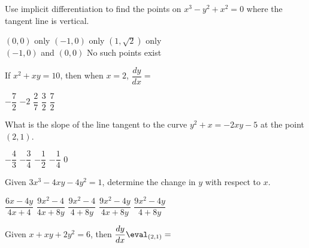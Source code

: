 \begin{questions}
    \question Use implicit differentiation to find the points on $x^3 - y^2 + x^2 = 0$ where the tangent line is vertical. \\

    \begin{oneparchoices}
        \choice $(0, 0)$ only
        \choice $(-1, 0)$ only
        \choice $\left(1, \sqrt{2}\right)$ only \\[11pt]
        \makebox[0.19\textwidth] \choice $(-1, 0)$ and $(0, 0)$
        \makebox[0.21\textwidth] \choice No such points exist
    \end{oneparchoices} \par \horizontalline

    \question If $x^2 + xy = 10$, then when $x = 2$, $\dfrac{dy}{dx} = $ \\
    
    \begin{oneparchoices}
        \choice $-\dfrac{7}{2}$
        \choice $-2$
        \choice $\dfrac{2}{7}$
        \choice $\dfrac{3}{2}$
        \choice $\dfrac{7}{2}$
    \end{oneparchoices} \par \horizontalline

    \question What is the slope of the line tangent to the curve $y^2 + x = -2xy - 5$ at the point $(2, 1)$. \\

    \begin{oneparchoices}
        \choice $-\dfrac{4}{3}$
        \choice $-\dfrac{3}{4}$
        \choice $-\dfrac{1}{2}$
        \choice $-\dfrac{1}{4}$
        \choice $0$
    \end{oneparchoices} \par \horizontalline

    \question Given $3x^3 - 4xy - 4y^2 = 1$, determine the change in $y$ with respect to $x$. \\

    \begin{oneparchoices}
        \choice $\dfrac{6x - 4y}{4x + 4}$
        \choice $\dfrac{9x^2 - 4}{4x + 8y}$
        \choice $\dfrac{9x^2 - 4}{4 + 8y}$
        \choice $\dfrac{9x^2 - 4y}{4x + 8y}$
        \choice $\dfrac{9x^2 - 4y}{4 + 8y}$
    \end{oneparchoices} \par \horizontalline

    \question Given $x + xy + 2y^2 = 6$, then $\dfrac{dy}{dx} \eval_{(2, 1)} = $ \\


\end{questions}
